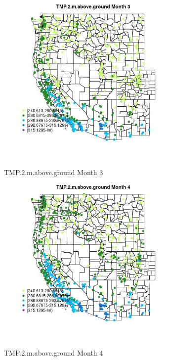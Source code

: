 \begin{figure} 
\centering  
\includegraphics[width=0.77\textwidth]{Code_Outputs/Report_ML_input_PM25_Step4_part_f_de_duplicated_aves_prioritize_24hr_obswNAs_MapObsMo3TMP2maboveground.jpg} 
\caption{\label{fig:Report_ML_input_PM25_Step4_part_f_de_duplicated_aves_prioritize_24hr_obswNAsMapObsMo3TMP2maboveground}TMP.2.m.above.ground Month 3} 
\end{figure} 
 

\begin{figure} 
\centering  
\includegraphics[width=0.77\textwidth]{Code_Outputs/Report_ML_input_PM25_Step4_part_f_de_duplicated_aves_prioritize_24hr_obswNAs_MapObsMo4TMP2maboveground.jpg} 
\caption{\label{fig:Report_ML_input_PM25_Step4_part_f_de_duplicated_aves_prioritize_24hr_obswNAsMapObsMo4TMP2maboveground}TMP.2.m.above.ground Month 4} 
\end{figure} 
 

